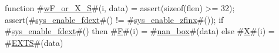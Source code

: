 function #\hyperref[sailRISCVzwFzyorzyXzyS]{wF\_or\_X\_S}#(i, data) = {
  assert(sizeof(flen) >= 32);
  assert(#\hyperref[sailRISCVzsyszyenablezyfdext]{sys\_enable\_fdext}#() != #\hyperref[sailRISCVzsyszyenablezyzzfinx]{sys\_enable\_zfinx}#());
  if   #\hyperref[sailRISCVzsyszyenablezyfdext]{sys\_enable\_fdext}#()
  then #\hyperref[sailRISCVzF]{F}#(i) = #\hyperref[sailRISCVznanzybox]{nan\_box}#(data)
  else #\hyperref[sailRISCVzX]{X}#(i) = #\hyperref[sailRISCVzEXTS]{EXTS}#(data)
}
